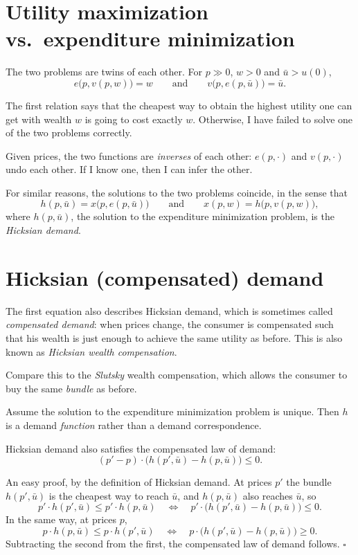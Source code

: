 \documentclass[11pt]{article}
\begin{document}


\section{Utility maximization vs.\ expenditure minimization}

The two problems are twins of each other. For $p\gg0$, $w>0$ and $\bar u>u(0)$,
\[ e\bigl(p,v(p,w)\bigr)=w\qquad\text{and}\qquad v\bigl(p,e(p,\bar u)\bigr)=\bar u . \]

The first relation says that the cheapest way to obtain the highest utility one can
get with wealth $w$ is going to cost exactly $w$. Otherwise, I have failed to solve
one of the two problems correctly.

 Given prices, the two functions are \emph{inverses} of each
other: $e(p,\cdot)$ and $v(p,\cdot)$ undo each other. If I know one, then I can
infer the other.

For similar reasons, the solutions to the two problems coincide, in the sense that
\[ h(p,\bar u)=x\bigl(p,e(p,\bar u)\bigr)\qquad\text{and}\qquad
   x(p,w)=h\bigl(p,v(p,w)\bigr), \]
where $h(p,\bar u)$, the solution to the expenditure minimization problem, is the
\emph{Hicksian demand}.

\section{Hicksian (compensated) demand}

The first equation also describes Hicksian demand, which is sometimes called
\emph{compensated demand}: when prices change, the consumer is compensated such
that his wealth is just enough to achieve the same utility as before. This is also
known as \emph{Hicksian wealth compensation}.

Compare this to the \emph{Slutsky} wealth compensation, which allows the consumer to
buy the same \emph{bundle} as before.

Assume the solution to the expenditure minimization problem is unique. Then $h$ is a
demand \emph{function} rather than a demand correspondence.

Hicksian demand also satisfies the compensated law of demand:
\[ (p'-p)\cdot\bigl(h(p',\bar u)-h(p,\bar u)\bigr)\le 0 . \]

 An easy proof, by the definition of Hicksian demand. At prices $p'$
the bundle $h(p',\bar u)$ is the cheapest way to reach $\bar u$, and $h(p,\bar u)$
also reaches $\bar u$, so
\[ p'\cdot h(p',\bar u)\le p'\cdot h(p,\bar u)
   \quad\iff\quad p'\cdot\bigl(h(p',\bar u)-h(p,\bar u)\bigr)\le 0 . \]
In the same way, at prices $p$,
\[ p\cdot h(p,\bar u)\le p\cdot h(p',\bar u)
   \quad\iff\quad p\cdot\bigl(h(p',\bar u)-h(p,\bar u)\bigr)\ge 0 . \]
Subtracting the second from the first, the compensated law of demand follows.
\hfill$\square$
\end{document}

